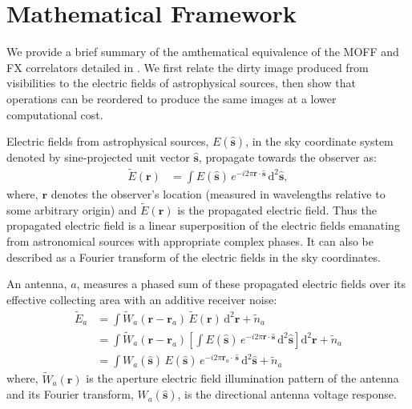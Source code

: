 \documentclass[a4paper,fleqn,usenatbib]{../mnras}
\newcommand{\dif}{\mathrm{d}}
\begin{document}

\section{Mathematical Framework}\label{sec:math}

We provide a brief summary of the amthematical equivalence of the MOFF and 
FX correlators detailed in \citet{mor11}. We first relate the dirty image produced 
from visibilities to the electric fields of astrophysical sources, then show that 
operations can be reordered to produce the same images at a lower 
computational cost.

Electric fields from astrophysical sources, $E(\hat{\mathbf{s}})$, in the sky
coordinate system denoted by sine-projected unit vector $\hat{\mathbf{s}}$, 
propagate towards the observer as:
\begin{align}
  \widetilde{E}(\mathbf{r}) &= \int E(\hat{\mathbf{s}})\,e^{-i2\pi\mathbf{r}\cdot\hat{\mathbf{s}}}\,\dif^2\hat{\mathbf{s}},
\end{align}
where, $\mathbf{r}$ denotes the observer's location (measured in wavelengths 
relative to some arbitrary origin) and $\widetilde{E}
(\mathbf{r})$ is the propagated electric field. Thus the propagated electric
field is a linear superposition of the electric fields emanating from
astronomical sources with appropriate complex phases. It can also be described
as a Fourier transform of the electric fields in the sky coordinates. 

An antenna, $a$, measures a phased sum of these propagated electric fields over
its effective collecting area with an additive receiver noise:
\begin{align}\label{eqn:measured-E-field}
  \widetilde{E}_a &= \int \widetilde{W}_a(\mathbf{r}-\mathbf{r}_a)\,\widetilde{E}(\mathbf{r})\,\dif^2\mathbf{r} + \widetilde{n}_a \\
                  &= \int \widetilde{W}_a(\mathbf{r}-\mathbf{r}_a) \left[ \int E(\hat{\mathbf{s}})\,e^{-i2\pi\mathbf{r}\cdot\hat{\mathbf{s}}}\,\dif^2\hat{\mathbf{s}} \right] \dif^2\mathbf{r} + \widetilde{n}_a \\
                  &= \int {W}_a(\hat{\mathbf{s}})\,E(\hat{\mathbf{s}})\,e^{-i2\pi\mathbf{r}_a\!\cdot\,\hat{\mathbf{s}}}\,\dif^2\hat{\mathbf{s}} + \widetilde{n}_a
\end{align}
where, $\widetilde{W}_a(\mathbf{r})$ is the aperture electric field illumination
pattern of the antenna and its Fourier transform, $W_a(\hat{\mathbf{s}})$, is the
directional antenna voltage response.
\end{document}
